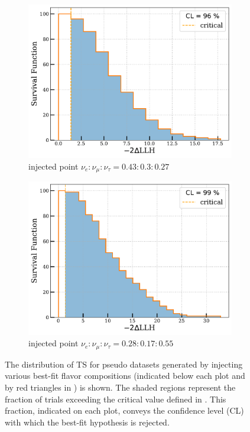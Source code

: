 \begin{figure}[hbt!]
\medskip %
\begin{subfigure}{.7\textwidth}
    \includegraphics[width=\linewidth]{./figures/results/96_distribution.pdf}
    \caption{injected point $\nu_e:\nu_{\mu}:\nu_{\tau} = 0.43:0.3:0.27$}
\end{subfigure}\hfill %
\begin{subfigure}{.7\textwidth}
    \includegraphics[width=\linewidth]{./figures/results/99_distribution.pdf}
    \caption{injected point $\nu_e:\nu_{\mu}:\nu_{\tau} = 0.28:0.17:0.55$}
\end{subfigure}

\caption{The distribution of TS for pseudo datasets generated by injecting various best-fit flavor compositions (indicated below each plot and by red triangles in ) is shown. The shaded regions represent the fraction of trials exceeding the critical value defined in . This fraction, indicated on each plot, conveys the confidence level (CL) with which the best-fit hypothesis is rejected.}
\end{figure}


